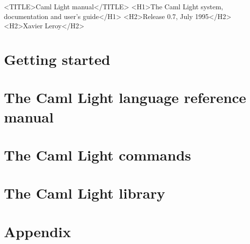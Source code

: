 \begin{rawhtml}
  <TITLE>Caml Light manual</TITLE>
  <H1>The Caml Light system, documentation and user's guide</H1>
  <H2>Release 0.7, July 1995</H2>
  <H2>Xavier Leroy</H2>
\end{rawhtml}



\part{Getting started} \label{p:gettingstarted}


\part{The Caml Light language reference manual} \label{p:refman}



\part{The Caml Light commands} \label{p:commands}







\part{The Caml Light library} \label{p:library}







\part{Appendix} \label{p:appendix}

